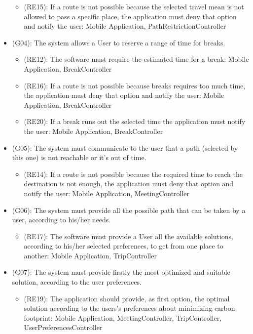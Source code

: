 \documentclass[a4paper,leqno]{article}
\begin{document}
\begin{itemize}
\begin{itemize}
		\item (RE15): If a route is not possible because the selected travel mean is not allowed to pass a specific place, the application must deny that option and notify the user: Mobile Application, PathRestrictionController
	\end{itemize}
	\item (G04): The system allows a User to reserve a range of time for breaks.
	\begin{itemize}
		\item (RE12): The software must require the estimated time for a break: Mobile Application, BreakController 
		\item (RE16): If a route is not possible because breaks requires too much time, the application must deny that option and notify the user: Mobile Application, BreakController
		\item (RE20): If a break runs out the selected time the application must notify the user: Mobile Application, BreakController
	\end{itemize}
	\item (G05): The system must communicate to the user that a path (selected by this one) is not reachable or it's out of time.
	\begin{itemize}
		\item (RE14): If a route is not possible because the required time to reach the destination is not enough, the application must deny that option and notify the user: Mobile Application, MeetingController
	\end{itemize}
	\item (G06): The system must provide all the possible path that can be taken by a user, according to his/her needs.
	\begin{itemize}
		\item (RE17): The software must provide a User all the available solutions, according to his/her selected preferences, to get from one place to another: Mobile Application, TripController
	\end{itemize}
	\item (G07): The system must provide firstly the most optimized and suitable solution, according to the user preferences.
	\begin{itemize}
		\item (RE19): The application should provide, as first option, the optimal solution according to the users's preferences about minimizing carbon footprint: Mobile Application,  MeetingController, TripController, UserPreferencesController

\end{itemize}
\end{itemize}
\end{document}
